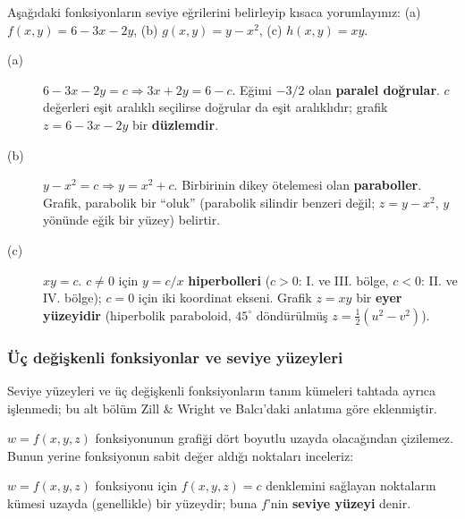 \begin{soru}
Aşağıdaki fonksiyonların seviye eğrilerini belirleyip kısaca yorumlayınız:
(a) $f(x,y)=6-3x-2y$, \quad (b) $g(x,y)=y-x^2$, \quad (c) $h(x,y)=xy$.
\end{soru}
\begin{cevap}
\begin{description}
  \item[(a)] $6-3x-2y=c\Rightarrow 3x+2y=6-c$. Eğimi $-3/2$ olan \textbf{paralel doğrular}. $c$ değerleri eşit aralıklı
  seçilirse doğrular da eşit aralıklıdır; grafik $z=6-3x-2y$ bir \textbf{düzlemdir}.
  \item[(b)] $y-x^2=c\Rightarrow y=x^2+c$. Birbirinin dikey ötelemesi olan \textbf{paraboller}. Grafik, parabolik bir
  ``oluk'' (parabolik silindir benzeri değil; $z=y-x^2$, $y$ yönünde eğik bir yüzey) belirtir.
  \item[(c)] $xy=c$. $c\neq0$ için $y=c/x$ \textbf{hiperbolleri} ($c>0$: I. ve III. bölge, $c<0$: II. ve IV. bölge);
  $c=0$ için iki koordinat ekseni. Grafik $z=xy$ bir \textbf{eyer yüzeyidir} (hiperbolik paraboloid,
  $45^\circ$ döndürülmüş $z=\tfrac12(u^2-v^2)$).
\end{description}
\end{cevap}

\subsubsection{Üç değişkenli fonksiyonlar ve seviye yüzeyleri}

\begin{bilgi}
Seviye yüzeyleri ve üç değişkenli fonksiyonların tanım kümeleri tahtada ayrıca işlenmedi; bu alt bölüm Zill \& Wright ve
Balcı'daki anlatıma göre eklenmiştir.
\end{bilgi}

$w=f(x,y,z)$ fonksiyonunun grafiği dört boyutlu uzayda olacağından çizilemez. Bunun yerine fonksiyonun sabit değer aldığı
noktaları inceleriz:

\begin{tanim}
$w=f(x,y,z)$ fonksiyonu için $f(x,y,z)=c$ denklemini sağlayan noktaların kümesi uzayda (genellikle) bir yüzeydir; buna
$f$'nin \textbf{seviye yüzeyi} denir.
\end{tanim}

